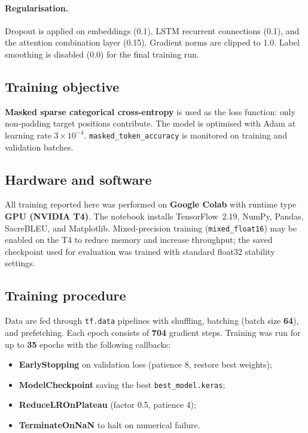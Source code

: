 \documentclass[12pt]{article}
\begin{document}
\paragraph{Regularisation.}
Dropout is applied on embeddings (0.1), LSTM recurrent connections (0.1), and the attention combination layer (0.15). Gradient norms are clipped to 1.0. Label smoothing is disabled ($0.0$) for the final training run.

\subsection{Training objective}
\textbf{Masked sparse categorical cross-entropy} is used as the loss function: only non-padding target positions contribute. The model is optimised with Adam at learning rate $3 \times 10^{-4}$. \texttt{masked\_token\_accuracy} is monitored on training and validation batches.

\subsection{Hardware and software}
All training reported here was performed on \textbf{Google Colab} with runtime type \textbf{GPU (NVIDIA T4)}. The notebook installs TensorFlow~2.19, NumPy, Pandas, SacreBLEU, and Matplotlib. Mixed-precision training (\texttt{mixed\_float16}) may be enabled on the T4 to reduce memory and increase throughput; the saved checkpoint used for evaluation was trained with standard float32 stability settings.

\subsection{Training procedure}
Data are fed through \texttt{tf.data} pipelines with shuffling, batching (batch size \textbf{64}), and prefetching. Each epoch consists of \textbf{704} gradient steps. Training was run for up to \textbf{35} epochs with the following callbacks:
\begin{itemize}
  \item \textbf{EarlyStopping} on validation loss (patience 8, restore best weights);
  \item \textbf{ModelCheckpoint} saving the best \texttt{best\_model.keras};
  \item \textbf{ReduceLROnPlateau} (factor 0.5, patience 4);
  \item \textbf{TerminateOnNaN} to halt on numerical failure.
\end{itemize}
\end{document}
